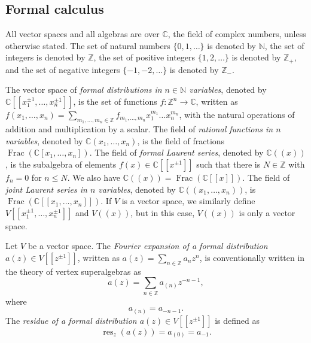 \documentclass[a4paper, 12pt, reqno]{amsart}
\theoremstyle{remark}
\DeclareMathOperator{\Frac}{Frac}
\DeclareMathOperator{\res}{res}
\begin{document}
\subsection{Formal calculus}
\label{sec:formal-calculus}

All vector spaces and all algebras are over $\mathbb{C}$, the field of complex numbers, unless otherwise stated.
The set of natural numbers $\{0, 1, \dots\}$ is denoted by $\mathbb{N}$, the set of integers is denoted by $\mathbb{Z}$, the set of positive integers $\{1, 2, \dots\}$ is denoted by $\mathbb{Z}_+$, and the set of negative integers $\{-1, -2, \dots\}$ is denoted by $\mathbb{Z}_-$.

The vector space of \emph{formal distributions in $n \in \mathbb{N}$ variables}, denoted by $\mathbb{C}[[x_1^{\pm 1}, \dots, x_n^{\pm 1}]]$, is the set of functions $f: \mathbb{Z}^n \to \mathbb{C}$, written as $f(x_1, \dots, x_n) = \sum_{m_1, \dots, m_n \in \mathbb{Z}}f_{m_1, \dots, m_n}x_1^{m_1}\dots x_n^{m_n}$, with the natural operations of addition and multiplication by a scalar.
The field of \emph{rational functions in $n$ variables}, denoted by $\mathbb{C}(x_1, \dots, x_n)$, is the field of fractions $\Frac(\mathbb{C}[x_1, \dots, x_n])$.
The field of \emph{formal Laurent series}, denoted by $\mathbb{C}((x))$, is the subalgebra of elements $f(x) \in \mathbb{C}[[x^{\pm 1}]]$ such that there is $N \in \mathbb{Z}$ with $f_n = 0$ for $n \le N$.
We also have $\mathbb{C}((x)) = \Frac(\mathbb{C}[[x]])$.
The field of \emph{joint Laurent series in $n$ variables}, denoted by $\mathbb{C}((x_1, \dots, x_n))$, is $\Frac(\mathbb{C}[[x_1, \dots, x_n]])$.
If $V$ is a vector space, we similarly define $V[[x_1^{\pm 1}, \dots, x_n^{\pm 1}]]$ and $V((x))$, but in this case, $V((x))$ is only a vector space.

Let $V$ be a vector space.
The \emph{Fourier expansion of a formal distribution $a(z) \in V[[z^{\pm 1}]]$}, written as $a(z) = \sum_{n \in \mathbb{Z}}a_nz^n$, is conventionally written in the theory of vertex superalgebras as
\begin{equation*}
  a(z) = \sum_{n \in \mathbb{Z}}a_{(n)}z^{-n - 1},
\end{equation*}
where
\begin{equation*}
  a_{(n)} = a_{-n - 1}.
\end{equation*}
The \emph{residue of a formal distribution $a(z) \in V[[z^{\pm 1}]]$} is defined as
\begin{equation*}
  \res_z(a(z)) = a_{(0)} = a_{-1}.
\end{equation*}
\end{document}
